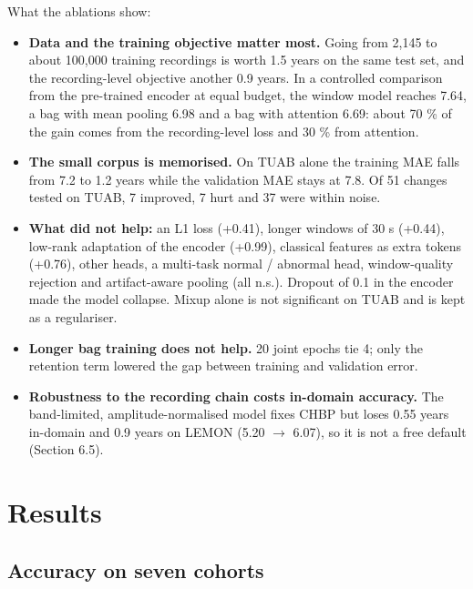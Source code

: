 \documentclass[11pt,a4paper]{article}
\begin{document}
What the ablations show:

\begin{itemize}
\item \textbf{Data and the training objective matter most.} Going from 2,145 to about 100,000 training recordings is worth 1.5 years on the same test set, and the recording-level objective another 0.9 years. In a controlled comparison from the pre-trained encoder at equal budget, the window model reaches 7.64, a bag with mean pooling 6.98 and a bag with attention 6.69: about 70 \% of the gain comes from the recording-level loss and 30 \% from attention.
\item \textbf{The small corpus is memorised.} On TUAB alone the training MAE falls from 7.2 to 1.2 years while the validation MAE stays at 7.8. Of 51 changes tested on TUAB, 7 improved, 7 hurt and 37 were within noise.
\item \textbf{What did not help:} an L1 loss (+0.41), longer windows of 30 s (+0.44), low-rank adaptation of the encoder (+0.99), classical features as extra tokens (+0.76), other heads, a multi-task normal / abnormal head, window-quality rejection and artifact-aware pooling (all n.s.). Dropout of 0.1 in the encoder made the model collapse. Mixup alone is not significant on TUAB and is kept as a regulariser.
\item \textbf{Longer bag training does not help.} 20 joint epochs tie 4; only the retention term lowered the gap between training and validation error.
\item \textbf{Robustness to the recording chain costs in-domain accuracy.} The band-limited, amplitude-normalised model fixes CHBP but loses 0.55 years in-domain and 0.9 years on LEMON (5.20 $\rightarrow$ 6.07), so it is not a free default (Section 6.5).
\end{itemize}

\section{Results}

\subsection{Accuracy on seven cohorts}
\end{document}
